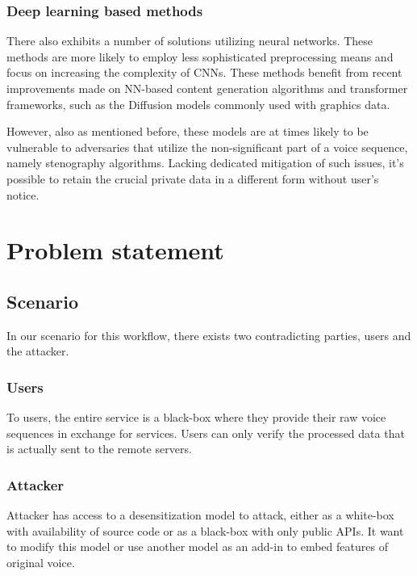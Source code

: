 \documentclass[journal]{IEEEtran} %
\begin{document}
\subsubsection{Deep learning based methods}

There also exhibits a number of solutions utilizing neural networks. These methods are more likely to employ less sophisticated preprocessing means and focus on increasing the complexity of CNNs. These methods benefit from recent improvements made on NN-based content generation algorithms and transformer frameworks, such as the Diffusion models commonly used with graphics data.\cite{a8}

However, also as mentioned before, these models are at times likely to be vulnerable to adversaries that utilize the non-significant part of a voice sequence, namely stenography algorithms. Lacking dedicated mitigation of such issues, it's possible to retain the crucial private data in a different form without user's notice.

\section{Problem statement}

\subsection{Scenario}

In our scenario for this workflow, there exists two contradicting parties, users and the attacker.

\subsubsection{Users}

To users, the entire service is a black-box where they provide their raw voice sequences in exchange for services. Users can only verify the processed data that is actually sent to the remote servers.

\subsubsection{Attacker}

Attacker has access to a desensitization model to attack, either as a white-box with availability of source code or as a black-box with only public APIs. It want to modify this model or use another model as an add-in to embed features of original voice.
\end{document}
